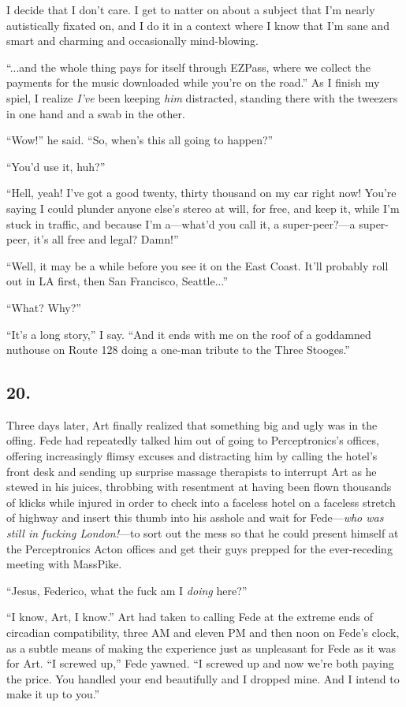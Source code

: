 I decide that I don’t care. I get to natter on about a subject that
I’m nearly autistically fixated on, and I do it in a context where
I know that I’m sane and smart and charming and occasionally
mind-blowing.

“...and the whole thing pays for itself through EZPass, where we
collect the payments for the music downloaded while you’re on the
road.” As I finish my spiel, I realize \emph{I’ve} been keeping
\emph{him} distracted, standing there with the tweezers in one hand
and a swab in the other.

“Wow!” he said. “So, when’s this all going to happen?”

“You’d use it, huh?”

“Hell, yeah! I’ve got a good twenty, thirty thousand on my car
right now! You’re saying I could plunder anyone else’s stereo at
will, for free, and keep it, while I’m stuck in traffic, and
because I’m a—what’d you call it, a super-peer?—a super-peer, it’s
all free and legal? Damn!”

“Well, it may be a while before you see it on the East Coast. It’ll
probably roll out in LA first, then San Francisco, Seattle...”

“What? Why?”

“It’s a long story,” I say. “And it ends with me on the roof of a
goddamned nuthouse on Route 128 doing a one-man tribute to the
Three Stooges.”

\subsection{20.}

Three days later, Art finally realized that something big and ugly
was in the offing. Fede had repeatedly talked him out of going to
Perceptronics’s offices, offering increasingly flimsy excuses and
distracting him by calling the hotel’s front desk and sending up
surprise massage therapists to interrupt Art as he stewed in his
juices, throbbing with resentment at having been flown thousands of
klicks while injured in order to check into a faceless hotel on a
faceless stretch of highway and insert this thumb into his asshole
and wait for Fede—\emph{who was still in fucking London!}—to sort
out the mess so that he could present himself at the Perceptronics
Acton offices and get their guys prepped for the ever-receding
meeting with MassPike.

“Jesus, Federico, what the fuck am I \emph{doing} here?”

“I know, Art, I know.” Art had taken to calling Fede at the extreme
ends of circadian compatibility, three AM and eleven PM and then
noon on Fede’s clock, as a subtle means of making the experience
just as unpleasant for Fede as it was for Art. “I screwed up,” Fede
yawned. “I screwed up and now we’re both paying the price. You
handled your end beautifully and I dropped mine. And I intend to
make it up to you.”

